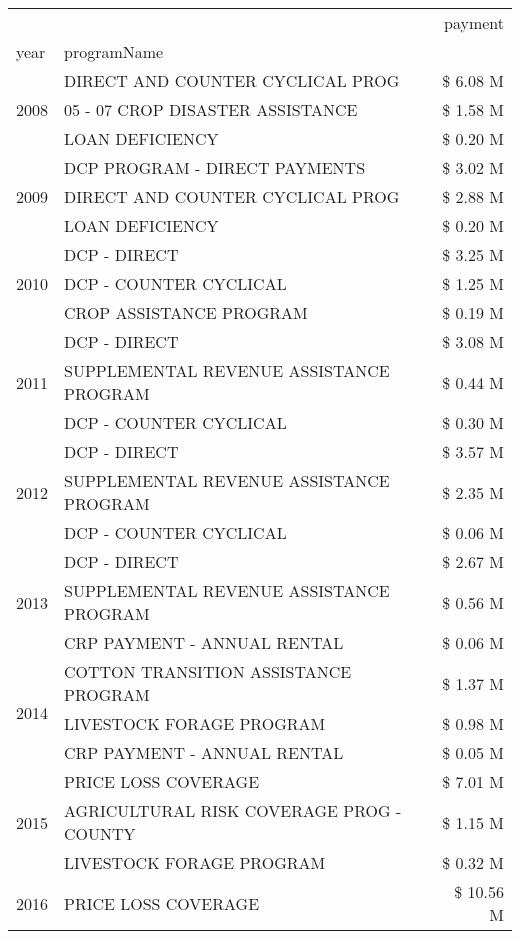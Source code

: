 \begin{tabular}{llr}
\toprule
 &  & payment \\
year & programName &  \\
\midrule
\multirow[t]{3}{*}{2008} & DIRECT AND COUNTER CYCLICAL PROG & \$ 6.08 M \\
 & 05 - 07 CROP DISASTER ASSISTANCE & \$ 1.58 M \\
 & LOAN DEFICIENCY & \$ 0.20 M \\
\cline{1-3}
\multirow[t]{3}{*}{2009} & DCP PROGRAM - DIRECT PAYMENTS & \$ 3.02 M \\
 & DIRECT AND COUNTER CYCLICAL PROG & \$ 2.88 M \\
 & LOAN DEFICIENCY & \$ 0.20 M \\
\cline{1-3}
\multirow[t]{3}{*}{2010} & DCP - DIRECT & \$ 3.25 M \\
 & DCP - COUNTER CYCLICAL & \$ 1.25 M \\
 & CROP ASSISTANCE PROGRAM & \$ 0.19 M \\
\cline{1-3}
\multirow[t]{3}{*}{2011} & DCP - DIRECT & \$ 3.08 M \\
 & SUPPLEMENTAL REVENUE ASSISTANCE PROGRAM & \$ 0.44 M \\
 & DCP - COUNTER CYCLICAL & \$ 0.30 M \\
\cline{1-3}
\multirow[t]{3}{*}{2012} & DCP - DIRECT & \$ 3.57 M \\
 & SUPPLEMENTAL REVENUE ASSISTANCE PROGRAM & \$ 2.35 M \\
 & DCP - COUNTER CYCLICAL & \$ 0.06 M \\
\cline{1-3}
\multirow[t]{3}{*}{2013} & DCP - DIRECT & \$ 2.67 M \\
 & SUPPLEMENTAL REVENUE ASSISTANCE PROGRAM & \$ 0.56 M \\
 & CRP PAYMENT - ANNUAL RENTAL & \$ 0.06 M \\
\cline{1-3}
\multirow[t]{3}{*}{2014} & COTTON TRANSITION ASSISTANCE PROGRAM & \$ 1.37 M \\
 & LIVESTOCK FORAGE PROGRAM & \$ 0.98 M \\
 & CRP PAYMENT - ANNUAL RENTAL & \$ 0.05 M \\
\cline{1-3}
\multirow[t]{3}{*}{2015} & PRICE LOSS COVERAGE & \$ 7.01 M \\
 & AGRICULTURAL RISK COVERAGE PROG - COUNTY & \$ 1.15 M \\
 & LIVESTOCK FORAGE PROGRAM & \$ 0.32 M \\
\cline{1-3}
\multirow[t]{3}{*}{2016} & PRICE LOSS COVERAGE & \$ 10.56 M \\

\end{tabular}
